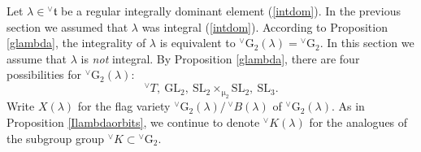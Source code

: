 \documentclass[a4paper, 11pt]{article}
\begin{document}
Let $\lambda\in {}^\vee\mathfrak{t}$ be a regular integrally dominant element
(\ref{intdom}).  In the previous section we assumed that $\lambda$ was
integral (\ref{intdom}).  According to Proposition \ref{glambda}, the
integrality of $\lambda$ is equivalent to
${}^{\vee}\mathrm{G}_{2}(\lambda) = {^\vee}\mathrm{G}_{2}$.
In this section we assume that $\lambda$ is \emph{not} integral.
By Proposition \ref{glambda}, there are four  possibilities for
${}^{\vee}\mathrm{G}_{2}(\lambda)$: 
$${^\vee}T, \ \mathrm{GL}_{2}, \
\mathrm{SL}_{2} \times_{\upmu_{2}} \mathrm{SL}_{2}, \ \mathrm{SL}_{3}.$$
Write $X(\lambda)$ for the flag variety 
${}^{\vee}\mathrm{G}_{2}(\lambda) /\,  ^{\vee}B(\lambda)$
of ${}^{\vee}\mathrm{G}_{2}(\lambda)$.
As in Proposition \ref{Ilambdaorbits}, we continue to denote
${}^{\vee}K(\lambda)$  for the analogues of the subgroup 
group ${}^{\vee}K \subset {}^{\vee}\mathrm{G}_{2}$.  
\end{document}
